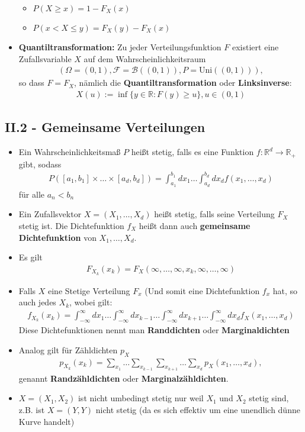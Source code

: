 \documentclass{scrartcl}
\newcommand{\mc}[1]{\mathcal{#1}}
\newcommand{\real}{\mathbb{R}}
\begin{document}
\begin{itemize}
    \begin{itemize}
        \item $P(X \geq x) = 1 - F_X(x)$
        \item $P(x < X \leq y) = F_X(y) - F_X(x)$
    \end{itemize}
    \item \textbf{Quantiltransformation:} Zu jeder Verteilungsfunktion $F$ existiert eine Zufallsvariable $X$ auf dem Wahrscheinlichkeitsraum
    \begin{align*}
    (\Omega = (0,1), \mc{F} = \mc{B}((0,1)), P = \text{Uni}((0,1))),    
    \end{align*} 
    so dass $F = F_X$, nämlich die \textbf{Quantiltransformation} oder \textbf{Linksinverse}:
    \begin{align*}
        X(u) := \inf{\{y \in \real: F(y) \geq u\}}, u \in (0,1)
    \end{align*}
\end{itemize}
\subsection*{II.2 - Gemeinsame Verteilungen}
\begin{itemize}
    \item Ein Wahrscheinlichkeitsmaß $P$ heißt stetig, falls es eine Funktion $f: \real^d \to \real_+$ gibt, sodass
    \begin{align*}
        P([a_1,b_1] \times \hdots \times [a_d,b_d]) = \int_{a_1}^{b_1} dx_1 \hdots \int_{a_d}^{b_d} dx_d f(x_1, \hdots, x_d) 
    \end{align*}
    für alle $a_n < b_n$
    \item Ein Zufallsvektor $X = (X_1, \hdots, X_d)$ heißt stetig, falls seine Verteilung $F_X$ stetig ist. Die Dichtefunktion $f_X$ heißt dann auch \textbf{gemeinsame Dichtefunktion} von $X_1, \hdots, X_d$.
    \item Es gilt 
    \begin{align*}
        F_{X_k}(x_k) = F_X(\infty, \hdots, \infty, x_k, \infty, \hdots, \infty)
    \end{align*}
    \item Falls $X$ eine Stetige Verteilung $F_x$ (Und somit eine Dichtefunktion $f_x$ hat, so auch jedes $X_k$, wobei gilt:
    \begin{align*}
        f_{X_k}(x_k) = \int_{-\infty}^\infty dx_1 \hdots \int_{-\infty}^\infty dx_{k-1} \hdots \int_{-\infty}^\infty dx_{k+1} \hdots \int_{-\infty}^\infty dx_d f_X(x_1, \hdots, x_d) 
    \end{align*}
    Diese Dichtefunktionen nennt man \textbf{Randdichten} oder \textbf{Marginaldichten}
    \item Analog gilt für Zähldichten $p_X$
    \begin{align*}
    p_{X_k}(x_k) = \sum_{x_1}\hdots\sum_{x_{k-1}}\sum_{x_{k+1}}\hdots\sum_{x_d}p_X(x_1, \hdots, x_d),
    \end{align*}
    genannt \textbf{Randzähldichten} oder \textbf{Marginalzähldichten}.
    \item $X = (X_1,X_2)$ ist nicht umbedingt stetig nur weil $X_1$ und $X_2$ stetig sind, z.B. ist $X = (Y,Y)$ nicht stetig (da es sich effektiv um eine unendlich dünne Kurve handelt)
\end{itemize}
\end{document}
